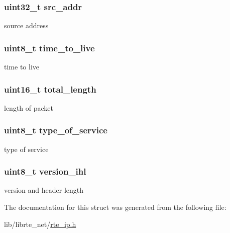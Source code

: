\subsubsection[{src\+\_\+addr}]{\setlength{\rightskip}{0pt plus 5cm}uint32\+\_\+t src\+\_\+addr}\label{structipv4__hdr_a6a462ff6ecd832025b4f8934f226d5b5}
source address \hypertarget{structipv4__hdr_a001bd5ec646244861baba152872aaf0e}{}
\subsubsection[{time\+\_\+to\+\_\+live}]{\setlength{\rightskip}{0pt plus 5cm}uint8\+\_\+t time\+\_\+to\+\_\+live}\label{structipv4__hdr_a001bd5ec646244861baba152872aaf0e}
time to live \hypertarget{structipv4__hdr_aa487bb47bd88257a2fcd58d10c7836a2}{}
\subsubsection[{total\+\_\+length}]{\setlength{\rightskip}{0pt plus 5cm}uint16\+\_\+t total\+\_\+length}\label{structipv4__hdr_aa487bb47bd88257a2fcd58d10c7836a2}
length of packet \hypertarget{structipv4__hdr_ad9000ab1449737219532b889f0da0f02}{}
\subsubsection[{type\+\_\+of\+\_\+service}]{\setlength{\rightskip}{0pt plus 5cm}uint8\+\_\+t type\+\_\+of\+\_\+service}\label{structipv4__hdr_ad9000ab1449737219532b889f0da0f02}
type of service \hypertarget{structipv4__hdr_a0f143df6fd0e09aba2963a160e33ce16}{}
\subsubsection[{version\+\_\+ihl}]{\setlength{\rightskip}{0pt plus 5cm}uint8\+\_\+t version\+\_\+ihl}\label{structipv4__hdr_a0f143df6fd0e09aba2963a160e33ce16}
version and header length 

The documentation for this struct was generated from the following file\+:\begin{DoxyCompactItemize}
\item 
lib/librte\+\_\+net/\hyperlink{rte__ip_8h}{rte\+\_\+ip.\+h}\end{DoxyCompactItemize}
